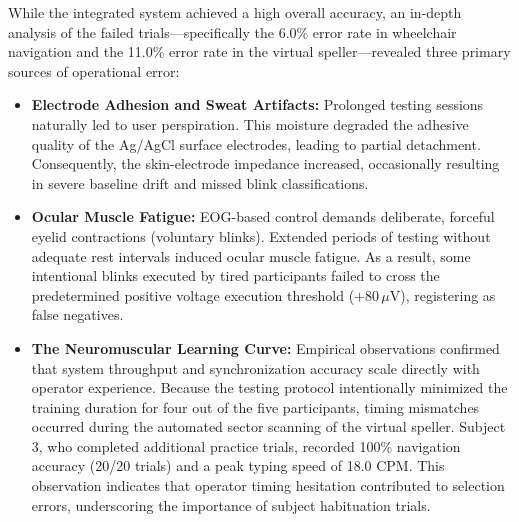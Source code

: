While the integrated system achieved a high overall accuracy, an in-depth analysis of the failed trials---specifically the 6.0\% error rate in wheelchair navigation and the 11.0\% error rate in the virtual speller---revealed three primary sources of operational error:

\begin{itemize}
    \item \textbf{Electrode Adhesion and Sweat Artifacts:} Prolonged testing sessions naturally led to user perspiration. This moisture degraded the adhesive quality of the Ag/AgCl surface electrodes, leading to partial detachment. Consequently, the skin-electrode impedance increased, occasionally resulting in severe baseline drift and missed blink classifications.

    \item \textbf{Ocular Muscle Fatigue:} EOG-based control demands deliberate, forceful eyelid contractions (voluntary blinks). Extended periods of testing without adequate rest intervals induced ocular muscle fatigue. As a result, some intentional blinks executed by tired participants failed to cross the predetermined positive voltage execution threshold ($+80\,\mu\text{V}$), registering as false negatives.

    \item \textbf{The Neuromuscular Learning Curve:} Empirical observations confirmed that system throughput and synchronization accuracy scale directly with operator experience. Because the testing protocol intentionally minimized the training duration for four out of the five participants, timing mismatches occurred during the automated sector scanning of the virtual speller. Subject 3, who completed additional practice trials, recorded 100\% navigation accuracy (20/20 trials) and a peak typing speed of 18.0 CPM. This observation indicates that operator timing hesitation contributed to selection errors, underscoring the importance of subject habituation trials.
\end{itemize}




